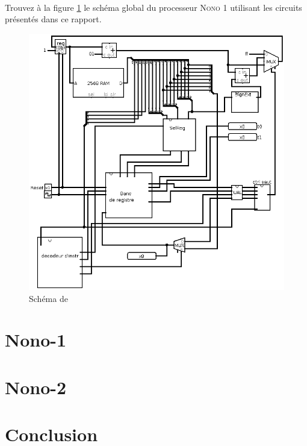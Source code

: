 \documentclass[a4paper]{article}
\begin{document}
		\paragraph{}{
				Trouvez à la figure \ref{nono_circ} le schéma global du processeur \textsc{Nono 1}
				utilisant les circuits présentés dans ce rapport.
		}
		
		\begin{figure}
			\centering
			\includegraphics[scale=0.35]{circuits/Nono-1.png}
			\caption{
			\label{nono_circ}
			Schéma de 
			}
		\end{figure}
					
	
		\section{Nono-1}
			
		\section{Nono-2}
			
	

	
	
	\newpage
	\section*{Conclusion}
\end{document}
